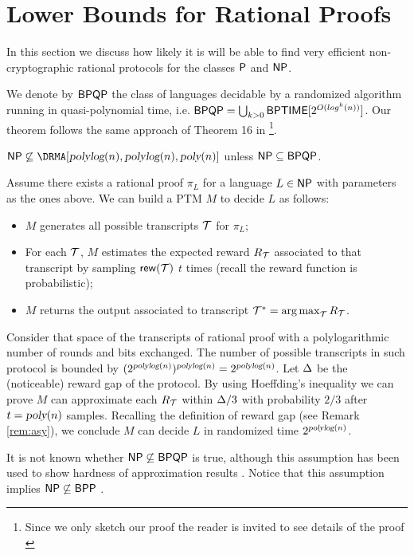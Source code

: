 
\section{Lower Bounds for Rational Proofs}

In this section we discuss how likely it is will be able to find very efficient non-cryptographic rational protocols for the classes $\P$ and $\NP$.

We denote by $\BPQP$ the class of languages decidable by a randomized algorithm running in quasi-polynomial time, i.e. $\BPQP = \bigcup_{k>0}\BPTIME[2^{O(log^k(n))} ]$.
Our theorem follows the same approach of Theorem 16 in \cite{ratargs}\footnote{Since we only sketch our proof the reader is invited to see details of the proof \cite{ratargs}}. 

\begin{theorem}
	\label{thm:np-limits}
	$\NP \not \subseteq \DRMA[\polylog(n), \polylog(n), \poly(n)]$  unless $\NP \subseteq \BPQP$. 
\end{theorem}
\begin{proofsketch}
Assume there exists a rational proof $\pi_L$ for a language $L \in \NP$ with parameters as the ones above.
We can build a PTM $M$ to decide $L$ as follows:
\begin{itemize}
	\item $M$ generates all possible transcripts $\Tau$ for $\pi_L$;
	\item For each $\Tau$, $M$ estimates the expected reward $R_{\Tau}$ associated to that transcript by sampling $\rew(\Tau)$ $t$ times (recall the reward function is probabilistic);
	\item $M$ returns the output associated to transcript $\Tau^* = \argmax_\Tau R_{\Tau}$.
\end{itemize}
Consider that space of the transcripts of rational proof with a polylogarithmic number of rounds and bits exchanged.
The number of possible transcripts in such protocol is bounded by $(2^{\polylog(n)})^{\polylog(n)} = 2^{\polylog(n)}$. 
Let $\rewGap$ be the (noticeable) reward gap of the protocol. By using Hoeffding's inequality we can prove $M$ can approximate each $R_\Tau$ within
$\rewGap/3$ with probability $2/3$ after $t = \poly(n)$ samples. Recalling the definition of reward gap (see Remark \ref{rem:asy}), we conclude $M$ can decide $L$ in randomized time $2^{\polylog(n)}$. 

\end{proofsketch}

It is not known whether $\NP \not \subseteq \BPQP$ is true, although this assumption has  been used to show hardness of approximation results \cite{makarychev2010maximum,khot2006better}.
Notice that this assumption  implies $\NP \not \subseteq \BPP$ \cite{johnson2006np}. 


